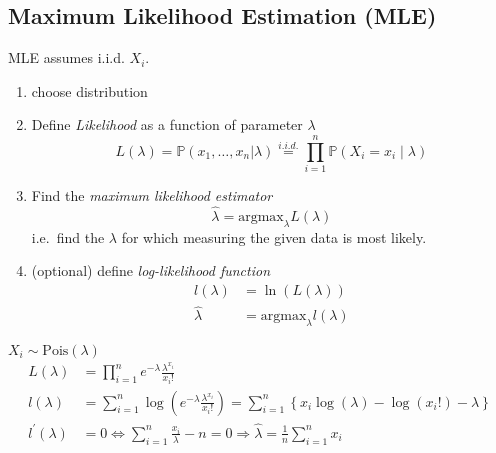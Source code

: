 \subsection{Maximum Likelihood Estimation (MLE)}
MLE assumes i.i.d. $X_i$.
\begin{enumerate}
    \item choose distribution
    \item Define \textit{Likelihood} as a function of parameter $\lambda$
          \noindent\begin{equation*}
              L(\lambda) = \mathbb{P}(x_1,\ldots ,x_n|\lambda) \stackrel{i.i.d.}{=} \prod_{i=1}^n\mathbb{P}(X_i=x_i\mid\lambda)
          \end{equation*}
    \item Find the \textit{maximum likelihood estimator}
          \noindent\begin{equation*}
              \hat{\lambda} = \mathrm{argmax}_\lambda L(\lambda)
          \end{equation*}
          i.e.\ find the $\lambda$ for which measuring the given data is most likely.
    \item (optional) define \textit{log-likelihood function}
          \noindent\begin{align*}
              l(\lambda)    & = \ln(L(\lambda))                    \\
              \hat{\lambda} & = \mathrm{argmax}_\lambda l(\lambda)
          \end{align*}
\end{enumerate}

\begin{examplesection}
    $X_i \sim \text{Pois}(\lambda)$
    \noindent\begin{align*}
        L(\lambda)          & =\prod_{i=1}^n e^{-\lambda}\frac{\lambda^{x_i}}{x_i!}                                                                               \\
        l(\lambda)          & =\sum_{i=1}^n\log\left(e^{-\lambda}\frac{\lambda^{x_i}}{x_i!}\right)=\sum_{i=1}^n\left\{x_i\log(\lambda)-\log(x_i!)-\lambda\right\} \\
        l^{\prime}(\lambda) & = 0 \Leftrightarrow \sum_{i=1}^n\frac{x_i}\lambda-n = 0 \Rightarrow \hat{\lambda} =\frac1n\sum_{i=1}^n x_i
    \end{align*}
\end{examplesection}

